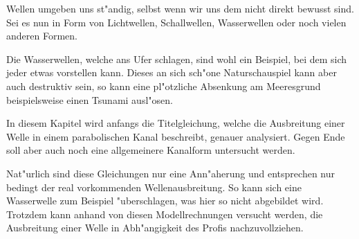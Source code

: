 Wellen umgeben uns st"andig, selbst wenn wir uns dem nicht direkt bewusst sind. 
Sei es nun in Form von Lichtwellen, Schallwellen, Wasserwellen oder noch vielen 
anderen Formen.

Die Wasserwellen, welche ans Ufer schlagen, sind wohl ein Beispiel, bei dem 
sich jeder etwas vorstellen kann. Dieses an sich sch"one 
Naturschauspiel kann aber auch destruktiv sein, so kann eine pl"otzliche 
Absenkung am Meeresgrund beispielsweise einen Tsunami ausl"osen.

In diesem Kapitel wird anfangs die Titelgleichung, welche die Ausbreitung einer 
Welle in einem parabolischen Kanal beschreibt, genauer analysiert. Gegen Ende 
soll aber auch noch eine allgemeinere Kanalform untersucht werden.

Nat"urlich sind diese Gleichungen nur eine Ann"aherung und entsprechen nur 
bedingt der real vorkommenden Wellenausbreitung. So kann sich eine Wasserwelle 
zum Beispiel "uberschlagen, was hier so nicht abgebildet wird. Trotzdem kann 
anhand von diesen Modellrechnungen versucht werden, die Ausbreitung einer Welle 
in Abh"angigkeit des Profis nachzuvollziehen.
